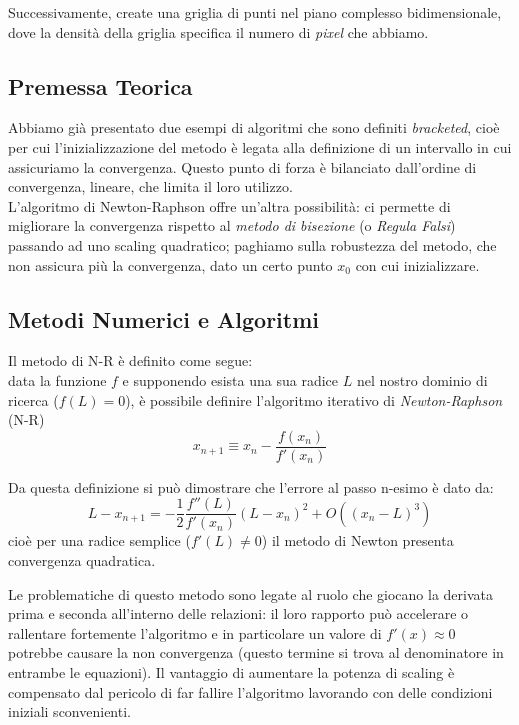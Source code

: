 Successivamente, create una griglia di punti nel piano complesso bidimensionale, dove la densità della griglia specifica il numero di \textit{pixel} che abbiamo.



\subsection{Premessa Teorica}
Abbiamo già presentato due esempi di algoritmi che sono definiti \textit{bracketed}, cioè per cui l'inizializzazione del metodo è legata alla definizione di un intervallo in cui assicuriamo la convergenza. Questo punto di forza è bilanciato dall'ordine di convergenza, lineare, che limita il loro utilizzo. \\
L'algoritmo di Newton-Raphson offre un'altra possibilità: ci permette di migliorare la convergenza rispetto al \textit{metodo di bisezione} (o \textit{Regula Falsi}) passando ad uno scaling quadratico; paghiamo sulla robustezza del metodo, che non assicura più la convergenza, dato un certo punto $x_0$ con cui inizializzare. 

\subsection{Metodi Numerici e Algoritmi}
Il metodo di N-R è definito come segue:\\
data la funzione $f$ e supponendo esista una sua radice $L$ nel nostro dominio di ricerca ($f(L)=0$), è possibile definire l'algoritmo iterativo di \textit{Newton-Raphson} (N-R) 
\[
    x_{n+1} \equiv x_n - \frac{f(x_n)}{f'(x_n)}
\]

\noindent Da questa definizione si può dimostrare che l'errore al passo n-esimo è dato da:
\[
    L - x_{n+1} = - \frac12 \frac{f''(L)}{f'(x_n)} (L-x_n)^2 + O((x_n-L)^3)
\]
cioè per una radice semplice ($f'(L) \not=0$) il metodo di Newton presenta convergenza quadratica. 
\medskip

\noindent Le problematiche di questo metodo sono legate al ruolo che giocano la derivata prima e seconda all'interno delle relazioni: il loro rapporto può accelerare o rallentare fortemente l'algoritmo e in particolare un valore di $f'(x) \approx 0$ potrebbe causare la non convergenza (questo termine si trova al denominatore in entrambe le equazioni). Il vantaggio di aumentare la potenza di scaling è compensato dal pericolo di far fallire l'algoritmo lavorando con delle condizioni iniziali sconvenienti. 



